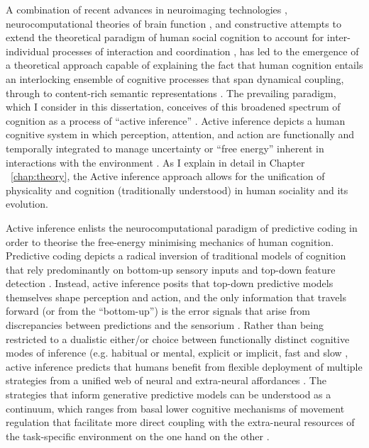 \begin{CJK}{UTF8}{gbsn}
A combination of recent advances in neuroimaging technologies \citep{Frith2007}, neurocomputational theories of brain function \citep{Friston2010,Frith2010,Yufik2013,Clark2013}, and constructive attempts to extend the theoretical paradigm of human social cognition to account for inter-individual processes of interaction and coordination \citep{Sebanz2006,Dale2014}, has led to the emergence of a theoretical approach capable of explaining the fact that human cognition entails an interlocking ensemble of cognitive processes that span dynamical coupling, through to content-rich semantic representations \citep{Roepstorff2011,Ramstead2016}. The prevailing paradigm, which I consider in this dissertation, conceives of this broadened spectrum of cognition as a process of ``active inference'' \citep{Friston2010}.  Active inference depicts a human cognitive system in which perception, attention, and action are functionally and temporally integrated to manage uncertainty or ``free energy'' inherent in interactions with the environment \citep{Clark2013}.  As I explain in detail in Chapter ~\ref{chap:theory}, the Active inference approach allows for the unification of physicality and cognition (traditionally understood) in human sociality and its evolution.

Active inference enlists the neurocomputational paradigm of predictive coding \citep{Rao1999,Clark2013} in order to theorise the free-energy minimising mechanics of human cognition.  Predictive coding depicts a radical inversion of traditional models of cognition that rely predominantly on bottom-up sensory inputs and top-down feature detection \citep{Marr1985}.  Instead, active inference posits that top-down predictive models themselves shape perception and action, and the only information that travels forward (or from the ``bottom-up'') is the error signals that arise from discrepancies between predictions and the sensorium \citep{Clark2015}.  Rather than being restricted to a dualistic either/or choice between functionally distinct cognitive modes of inference (e.g. habitual or mental, explicit or implicit, fast and slow \citep[cf.][]{Dienes1999,Kahneman2011}, active inference predicts that humans benefit from flexible deployment of multiple strategies from a unified web of neural and extra-neural affordances \citep{Pezzulo2013,Clark2015}.  The strategies that inform generative predictive models can be understood as a continuum, which ranges from basal lower cognitive mechanisms of movement regulation that facilitate more direct coupling with the extra-neural resources of the task-specific environment on the one hand on the other \citep{Riley2011}.


\end{CJK}
